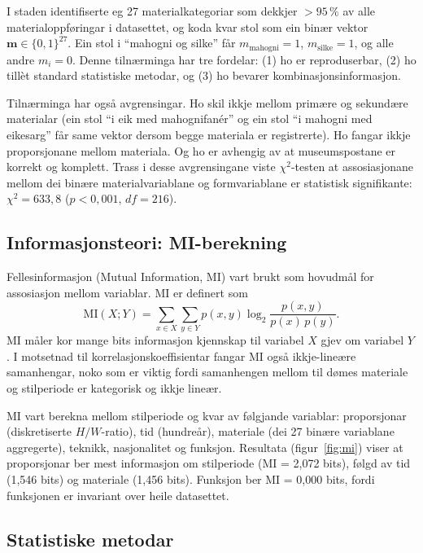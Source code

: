 \documentclass[10pt, a4paper, twocolumn]{article}
\begin{document}
I staden identifiserte eg 27 materialkategoriar som dekkjer $> 95\,\%$ av alle materialoppføringar i datasettet, og koda kvar stol som ein binær vektor $\mathbf{m} \in \{0, 1\}^{27}$. Ein stol i ``mahogni og silke'' får $m_{\text{mahogni}} = 1$, $m_{\text{silke}} = 1$, og alle andre $m_i = 0$. Denne tilnærminga har tre fordelar: (1) ho er reproduserbar, (2) ho tillèt standard statistiske metodar, og (3) ho bevarer kombinasjonsinformasjon.

Tilnærminga har også avgrensingar. Ho skil ikkje mellom primære og sekundære materialar (ein stol ``i eik med mahognifanér'' og ein stol ``i mahogni med eikesarg'' får same vektor dersom begge materiala er registrerte). Ho fangar ikkje proporsjonane mellom materiala. Og ho er avhengig av at museumspostane er korrekt og komplett. Trass i desse avgrensingane viste $\chi^2$-testen at assosiasjonane mellom dei binære materialvariablane og formvariablane er statistisk signifikante: $\chi^2 = 633{,}8$ ($p < 0{,}001$, $df = 216$).

\subsection{Informasjonsteori: MI-berekning}

Fellesinformasjon (Mutual Information, MI) vart brukt som hovudmål for assosiasjon mellom variablar. MI er definert som
\[
  \text{MI}(X;Y) = \sum_{x \in X} \sum_{y \in Y} p(x,y) \log_2 \frac{p(x,y)}{p(x)\,p(y)}.
\]
MI måler kor mange bits informasjon kjennskap til variabel $X$ gjev om variabel $Y$ \citep{cover2006}. I motsetnad til korrelasjonskoeffisientar fangar MI også ikkje-lineære samanhengar, noko som er viktig fordi samanhengen mellom til dømes materiale og stilperiode er kategorisk og ikkje lineær.

MI vart berekna mellom stilperiode og kvar av følgjande variablar: proporsjonar (diskretiserte $H/W$-ratio), tid (hundreår), materiale (dei 27 binære variablane aggregerte), teknikk, nasjonalitet og funksjon. Resultata (figur~\ref{fig:mi}) viser at proporsjonar ber mest informasjon om stilperiode (MI = 2,072 bits), følgd av tid (1,546 bits) og materiale (1,456 bits). Funksjon ber MI = 0,000 bits, fordi funksjonen er invariant over heile datasettet.

\subsection{Statistiske metodar}
\end{document}
